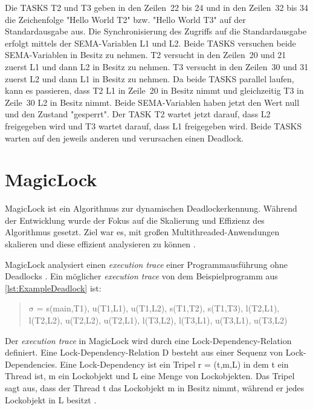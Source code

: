 Die \textrm{TASKS} \textrm{T2} und \textrm{T3} geben in den Zeilen~22 bis 24 und
in den Zeilen~32 bis 34 die Zeichenfolge "Hello World T2" bzw. "Hello World T3"
auf der Standardausgabe aus. Die Synchronisierung des Zugriffs auf die
Standardausgabe erfolgt mittels der \textrm{SEMA}-Variablen \textrm{L1} und
\textrm{L2}. Beide \textrm{TASKS} versuchen beide \textrm{SEMA}-Variablen in
Besitz zu nehmen. \textrm{T2} versucht in den Zeilen~20 und 21 zuerst
\textrm{L1} und dann \textrm{L2} in Besitz zu nehmen. \textrm{T3} versucht in
den Zeilen~30 und 31 zuerst \textrm{L2} und dann \textrm{L1} in Besitz zu
nehmen. Da beide \textrm{TASKS} parallel laufen, kann es passieren, dass
\textrm{T2} \textrm{L1} in Zeile~20 in Besitz nimmt und gleichzeitig \textrm{T3}
in Zeile~30 \textrm{L2} in Besitz nimmt. Beide \textrm{SEMA}-Variablen haben
jetzt den Wert null und den Zustand "gesperrt". Der \textrm{TASK} \textrm{T2}
wartet jetzt darauf, dass \textrm{L2} freigegeben wird und
\textrm{T3} wartet darauf, dass \textrm{L1} freigegeben wird. Beide \textrm{TASKS}
warten auf den jeweils anderen und verursachen einen Deadlock.

\section{MagicLock}
\label{section:MagicLock}
MagicLock ist ein Algorithmus zur dynamischen Deadlockerkennung. Während der
Entwicklung wurde der Fokus auf die Skalierung und Effizienz des Algorithmus
gesetzt. Ziel war es, mit großen Multithreaded-Anwendungen skalieren und diese
effizient analysieren zu können \autocite[vgl.][1]{MagicLock}.

MagicLock analysiert einen \emph{execution trace} einer Programmausführung ohne
Deadlocks \autocite[vgl.][4]{MagicLock}. Ein möglicher \emph{execution trace}
von dem Beispielprogramm aus \cref{lst:ExampleDeadlock} ist:
\begin{quote}
  $\mathrm{\sigma}$ = \textrm{s(main,T1), u(T1,L1), u(T1,L2), s(T1,T2),
  s(T1,T3), l(T2,L1), l(T2,L2), u(T2,L2), u(T2,L1), l(T3,L2), l(T3,L1),
  u(T3,L1), u(T3,L2)}
\end{quote}
Der \emph{execution trace} in MagicLock wird durch eine Lock-Dependency-Relation
definiert. Eine Lock-Dependency-Relation \textrm{D} besteht aus einer Sequenz
von Lock-Dependencies. Eine Lock-Dependency ist ein Tripel \textrm{r = (t,m,L)}
in dem \textrm{t} ein Thread ist, \textrm{m} ein Lockobjekt und \textrm{L} eine
Menge von Lockobjekten. Das Tripel sagt aus, dass der Thread \textrm{t} das
Lockobjekt \textrm{m} in Besitz nimmt, während er jedes Lockobjekt in \textrm{L}
besitzt \autocite[vgl.][3]{MagicLock}.

